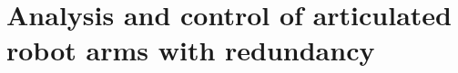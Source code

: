 \section[1981 Hanafusa, Yoshikawa, Nakamura]{Analysis and control of articulated robot arms with redundancy}
